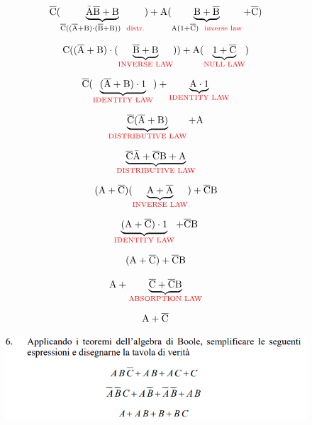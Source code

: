 \begin{equation*}
\negatoC(\underbrace{\negatoAbar\negatoB + \B} _{\negatoC((\negatoA + \B) \cdot (\negatoB + \B)) \textrm{\color{red} \hspace{0.2cm}distr.}}) + \A(\underbrace{\B + \negatoB} _{\A(1 + \negatoC) \hspace{0.2cm}\textrm{\color{red}inverse law}} + \negatoC) 
\end{equation*}

\begin{equation*}
	\C((\negatoA + \B) \cdot (\underbrace{\negatoB + \B} _{\inverse}) ) + \A(\underbrace{1 + \negatoC} _{\nulllaw})
\end{equation*}

\begin{equation*}
	\negatoC(\underbrace{(\negatoA + \B) \cdot 1} _{\identity}) + \underbrace{\A \cdot 1} _{\identity}
\end{equation*}

\begin{equation*}
	\underbrace{\negatoC(\negatoA + \B)} _{\distr} + \A
\end{equation*}

\begin{equation*}
	\underbrace{\negatoC\negatoAbar + \negatoC\B + \A} _{\distr}
\end{equation*}

\begin{equation*}
	(\A + \negatoC)(\underbrace{\A + \negatoA} _{\inverse}) + \negatoC\B
\end{equation*}

\begin{equation*}
	\underbrace{(\A + \negatoC) \cdot 1} _{\identity} + \negatoC\B
\end{equation*}

\begin{equation*}
	(\A + \negatoC) + \negatoC\B
\end{equation*}

\begin{equation*}
\A + \underbrace{\negatoC + \negatoC\B} _{\absorption}
\end{equation*}

\begin{equation*}
	\A + \negatoC
\end{equation*}


\pagebreak

\begin{figure}[ht]
	\includegraphics[width=1\linewidth]{es6_pag11_AlgebraDiBoole}
	\label{fig:es6pag11algebradiboole}
\end{figure}

